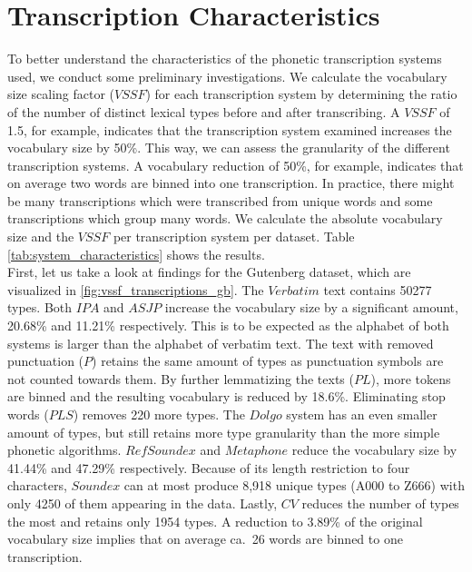 \section{Transcription Characteristics}
To better understand the characteristics of the phonetic transcription systems used, we conduct some preliminary investigations.
We calculate the vocabulary size scaling factor ($VSSF$) for each transcription system by determining the ratio of the number of distinct lexical types before and after transcribing.
A $VSSF$ of 1.5, for example, indicates that the transcription system examined increases the vocabulary size by 50\%.
This way, we can assess the granularity of the different transcription systems.
A vocabulary reduction of 50\%, for example, indicates that on average two words are binned into one transcription.
In practice, there might be many transcriptions which were transcribed from unique words and some transcriptions which group many words.
We calculate the absolute vocabulary size and the $VSSF$ per transcription system per dataset.
Table \ref{tab:system_characteristics} shows the results.\\
First, let us take a look at findings for the Gutenberg dataset, which are visualized in \ref{fig:vssf_transcriptions_gb}.
The $Verbatim$ text contains 50277 types.
Both $IPA$ and $ASJP$ increase the vocabulary size by a significant amount, 20.68\% and 11.21\% respectively.
This is to be expected as the alphabet of both systems is larger than the alphabet of verbatim text.
The text with removed punctuation ($P$) retains the same amount of types as punctuation symbols are not counted towards them.
By further lemmatizing the texts ($PL$), more tokens are binned and the resulting vocabulary is reduced by 18.6\%.
Eliminating stop words ($PLS$) removes 220 more types.
The $Dolgo$ system has an even smaller amount of types, but still retains more type granularity than the more simple phonetic algorithms.
$RefSoundex$ and $Metaphone$ reduce the vocabulary size by 41.44\% and 47.29\% respectively.
Because of its length restriction to four characters, $Soundex$ can at most produce 8,918 unique types (A000 to Z666) with only 4250 of them appearing in the data.
Lastly, $CV$ reduces the number of types the most and retains only 1954 types.
A reduction to 3.89\% of the original vocabulary size implies that on average ca.\ 26 words are binned to one transcription.\\

